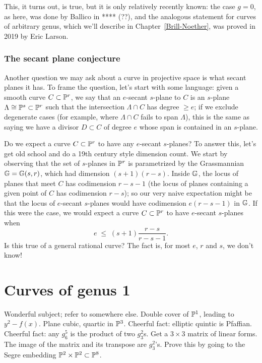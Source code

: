 This, it turns out, is true, but it is only relatively recently known: the case $g=0$, as here, was done by Ballico in **** (??), and the analogous statement for curves of arbitrary genus, which we'll describe in Chapter~\ref{Brill-Noether}, was proved in 2019 by Eric Larson.

\subsubsection{The secant plane conjecture}

Another question we may ask about a curve in projective space is what secant planes it has. To frame the question, let's start with some language: given a smooth curve $C \subset {\mathbb P}^r$, we say that an $e$-secant $s$-plane to $C$ is an $s$-plane $\Lambda \cong {\mathbb P}^s \subset {\mathbb P}^r$ such that the intersection $\Lambda \cap C$ has degree $\geq e$; if we exclude degenerate cases (for example, where $\Lambda \cap C$ fails to span $\Lambda$), this is the same as saying we have a divisor $D \subset C$ of degree $e$ whose span is contained in an $s$-plane.

Do we expect a curve $C \subset {\mathbb P}^r$ to have any $e$-secant $s$-planes? To answer this, let's get old school and do a 19th century style dimension count. We start by observing that the set of $s$-planes in ${\mathbb P}^r$ is parametrized by the Grassmannian ${\mathbb G} = {\mathbb G}(s,r)$, which had dimension $(s+1)(r-s)$. Inside ${\mathbb G}$, the locus of planes that meet $C$ has codimension $r-s-1$ (the locus of planes containing a given point of $C$ has codimension $r-s$); so our very naive expectation might be that the locus of $e$-secant $s$-planes would have codimension $e(r-s-1)$ in ${\mathbb G}$. If this were the case, we would expect a curve $C \subset {\mathbb P}^r$ to have $e$-secant $s$-planes when 
$$
e \; \leq \; (s+1)\frac{r-s}{r-s-1}.
$$
Is this true of a general rational curve? The fact is, for most $e$, $r$ and $s$, we don't know!

\section{Curves of genus 1}

Wonderful subject; refer to somewhere else. Double cover of ${\mathbb P}^1$, leading to $y^2 - f(x)$. Plane cubic, quartic in ${\mathbb P}^3$. Cheerful fact:  elliptic quintic is Pfaffian. Cheerful fact: any $g^5_6$ is the product of two $g^2_3$s. Get a $3\times 3$ matrix of linear forms. The image of the matrix and its transpose are $g^2_3$'s. Prove this by going to the Segre embedding ${\mathbb P}^2\times {\mathbb P}^2 \subset{\mathbb P}^8$.

